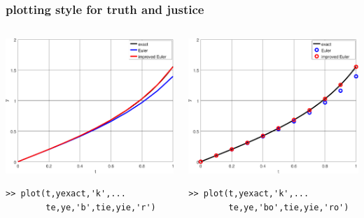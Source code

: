 \documentclass[urlcolor=blue,dvipsnames]{beamer}
\begin{document}
\begin{frame}[fragile]
\frametitle{plotting style for truth and justice}

\begin{columns}
\begin{column}{0.5\textwidth}
\includegraphics[width=\textwidth]{figs/badstyle}

\begin{Verbatim}[fontsize=\scriptsize]
>> plot(t,yexact,'k',...
        te,ye,'b',tie,yie,'r')
\end{Verbatim}
\end{column}
\begin{column}{0.5\textwidth}
\includegraphics[width=\textwidth]{figs/goodstyle}

\begin{Verbatim}[fontsize=\scriptsize]
>> plot(t,yexact,'k',...
        te,ye,'bo',tie,yie,'ro')
\end{Verbatim}
\end{column}
\end{columns}
\end{frame}
\end{document}
